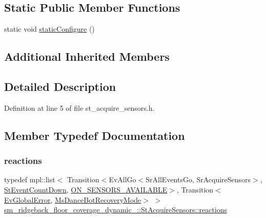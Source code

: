 \subsection*{Static Public Member Functions}
\begin{DoxyCompactItemize}
\item 
static void \hyperlink{structsm__ridgeback__floor__coverage__dynamic__1_1_1StAcquireSensors_a013cc09c170d2a22d3946ed427dd85dc}{static\+Configure} ()
\end{DoxyCompactItemize}
\subsection*{Additional Inherited Members}


\subsection{Detailed Description}


Definition at line 5 of file st\+\_\+acquire\+\_\+sensors.\+h.



\subsection{Member Typedef Documentation}
\mbox{\label{structsm__ridgeback__floor__coverage__dynamic__1_1_1StAcquireSensors_af1276672402d621a5e270a48d5f79586}} 
\subsubsection{\texorpdfstring{reactions}{reactions}}
{\footnotesize\ttfamily typedef mpl\+::list$<$ Transition$<$Ev\+All\+Go$<$Sr\+All\+Events\+Go, Sr\+Acquire\+Sensors$>$, \hyperlink{structsm__ridgeback__floor__coverage__dynamic__1_1_1StEventCountDown}{St\+Event\+Count\+Down}, \hyperlink{structsm__ridgeback__floor__coverage__dynamic__1_1_1StAcquireSensors_1_1ON__SENSORS__AVAILABLE}{O\+N\+\_\+\+S\+E\+N\+S\+O\+R\+S\+\_\+\+A\+V\+A\+I\+L\+A\+B\+LE}$>$, Transition$<$\hyperlink{structsm__ridgeback__floor__coverage__dynamic__1_1_1EvGlobalError}{Ev\+Global\+Error}, \hyperlink{classsm__ridgeback__floor__coverage__dynamic__1_1_1MsDanceBotRecoveryMode}{Ms\+Dance\+Bot\+Recovery\+Mode}$>$ $>$ \hyperlink{structsm__ridgeback__floor__coverage__dynamic__1_1_1StAcquireSensors_af1276672402d621a5e270a48d5f79586}{sm\+\_\+ridgeback\+\_\+floor\+\_\+coverage\+\_\+dynamic\+\_\+::\+St\+Acquire\+Sensors\+::reactions}}



